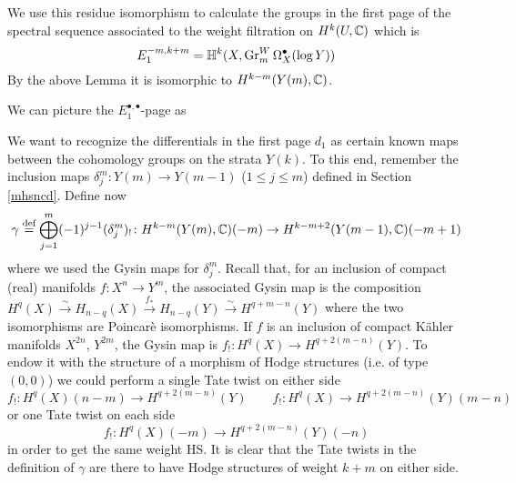 \documentclass[../main.tex]{subfiles}
\begin{document}
We use this residue isomorphism to calculate the groups in the first page of the spectral sequence  associated to the weight filtration on $H^k(U, \mathbb{C})$ which is 
\[
E^{-m,k+m}_1 = \mathbb{H}^k(X, \operatorname{Gr}^W_m \Omega^\bullet_X(\log Y))
\]
By the above Lemma it is isomorphic to $H^{k-m}(Y(m), \mathbb{C})$. 

We can picture the $E_1^{\bullet,\bullet}$-page as 
\begin{center}
\end{center}


We want to recognize the differentials in the first page $d_1$ as certain known maps between the cohomology groups on the strata $Y(k)$. To this end, remember the inclusion maps $\delta_j^m\colon Y(m) \to Y(m-1)$ ($1 \leq j \leq m$)  defined in Section \ref{mhsncd}. Define now
\[
\gamma \stackrel{\text{def}}{=} \bigoplus_{j=1}^m (-1)^{j-1} (\delta_j^m)_! \colon H^{k-m}(Y(m), \mathbb{C})(-m) \to H^{k-m+2}(Y(m-1), \mathbb{C})(-m+1)
\]
where we used the Gysin maps for $\delta_j^m$.
Recall that, for an inclusion of compact (real) manifolds $f \colon X^n \to Y^m$, the associated Gysin map is the composition $H^q(X) \xrightarrow{\sim} H_{n-q}(X) \xrightarrow{f_*} H_{n-q}(Y) \xrightarrow{\sim} H^{q+m-n}(Y)$ where the two isomorphisms are Poincarè isomorphisms.
If $f$ is an inclusion of compact K\"{a}hler manifolds $X^{2n}$, $Y^{2m}$, the Gysin map is $f_! \colon H^q(X) \to H^{q+2(m-n)}(Y)$. To endow it with the structure of a morphism of Hodge structures (i.e. of type $(0,0)$) we could perform a single Tate twist on either side 
\[
f_! \colon H^q(X)(n-m) \to H^{q+2(m-n)}(Y) \qquad f_! \colon H^q(X) \to H^{q+2(m-n)}(Y)(m-n)
\]
or one Tate twist on each side
\[
f_! \colon H^q(X)(-m) \to H^{q+2(m-n)}(Y)(-n)
\]
in order to get the same weight HS.
It is clear that the Tate twists in the definition of $\gamma$ are there to have Hodge structures of weight $k+m$ on either side.
\end{document}
